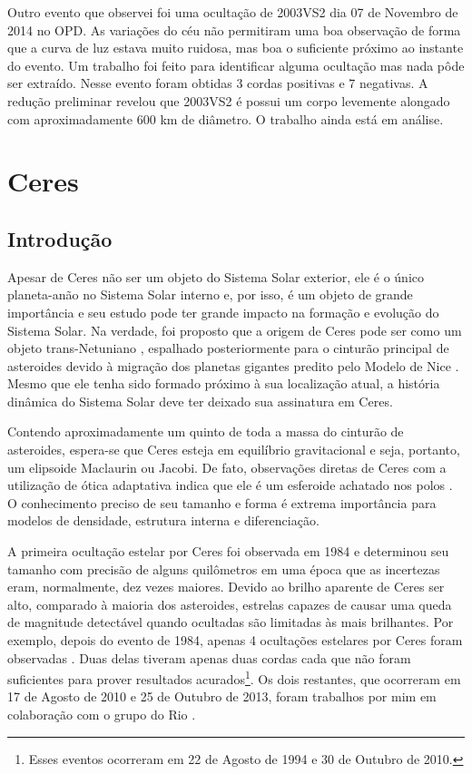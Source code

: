 \documentclass[12pt,a4paper]{monografia}
\begin{document}
Outro evento que observei foi uma ocultação de 2003VS2 dia 07 de Novembro de 2014 no OPD. As variações do céu não permitiram uma boa observação de forma que a curva de luz estava muito ruidosa, mas boa o suficiente próximo ao instante do evento. Um trabalho foi feito para identificar alguma ocultação mas nada pôde ser extraído. Nesse evento foram obtidas 3 cordas positivas e 7 negativas. A redução preliminar revelou que 2003VS2 é possui um corpo levemente alongado com aproximadamente 600 km de diâmetro. O trabalho ainda está em análise.


\chapter{Ceres}
\label{Cap: Ceres}

\section{Introdução}
\label{Sec: Ceres-intro}

\indent \indent Apesar de Ceres não ser um objeto do Sistema Solar exterior, ele é o único planeta-anão no Sistema Solar interno e, por isso, é um objeto de grande importância e seu estudo pode ter grande impacto na formação e evolução do Sistema Solar. Na verdade, foi proposto que a origem de Ceres pode ser como um objeto trans-Netuniano \citep{McKinnon2012}, espalhado posteriormente para o cinturão principal de asteroides devido à migração dos planetas gigantes predito pelo Modelo de Nice \citep{Gomes2005}. Mesmo que ele tenha sido formado próximo à sua localização atual, a história dinâmica do Sistema Solar deve ter deixado sua assinatura em Ceres.

Contendo aproximadamente um quinto de toda a massa do cinturão de asteroides, espera-se que Ceres esteja em equilíbrio gravitacional e seja, portanto, um elipsoide Maclaurin ou Jacobi. De fato, observações diretas de Ceres com a utilização de ótica adaptativa indica que ele é um esferoide achatado nos polos \citep{Drummond2014}. O conhecimento preciso de seu tamanho e forma é extrema importância para modelos de densidade, estrutura interna e diferenciação.

A primeira ocultação estelar por Ceres foi observada em 1984 \citep{Millis1987} e determinou seu tamanho com precisão de alguns quilômetros em uma época que as incertezas eram, normalmente, dez vezes maiores. Devido ao brilho aparente de Ceres ser alto, comparado à maioria dos asteroides, estrelas capazes de causar uma queda de magnitude detectável quando ocultadas são limitadas às mais brilhantes. Por exemplo, depois do evento de 1984, apenas 4 ocultações estelares por Ceres foram observadas \citep{Dunham2014}. Duas delas tiveram apenas duas cordas cada que não foram suficientes para prover resultados acurados\footnote{Esses eventos ocorreram em 22 de Agosto de 1994 e 30 de Outubro de 2010.}. Os dois restantes, que ocorreram em 17 de Agosto de 2010 e 25 de Outubro de 2013, foram trabalhos por mim em colaboração com o grupo do Rio \citep{GomesJunior2015-Ceres}.
\end{document}
